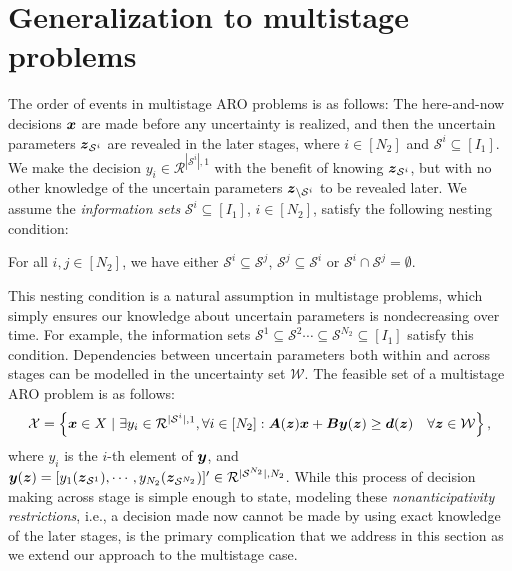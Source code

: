 \documentclass[fleqn,orsc,blindrev]{informs4}
\newcommand{\mb}[1]{\mbox{\boldmath \ensuremath{#1}}}
\begin{document}
\section{Generalization to multistage problems} \label{sec:multi}	
	The order of events in multistage ARO problems is as follows: The here-and-now decisions $\mb{x}$ are made before any uncertainty is realized, and then the uncertain parameters $\mb{z}_{\mathcal{S}^i}$ are revealed in the later stages, where $i\in [N_2]$ and $\mathcal{S}^i\subseteq [I_1]$. We make the decision $y_i \in \mathcal{R}^{|\mathcal{S}^i|,1}$ with the benefit of knowing $\mb{z}_{\mathcal{S}^i}$, but with no other knowledge of the uncertain parameters $\mb{z}_{\setminus \mathcal{S}^i}$ to be revealed later. We assume the {\em information sets} $\mathcal{S}^i\subseteq [I_1]$, $i\in [N_2]$, satisfy the following nesting condition: 
	\begin{definition}
		For all $i,j \in [N_2]$, we have either $\mathcal{S}^i \subseteq \mathcal{S}^j$, $\mathcal{S}^j \subseteq \mathcal{S}^i$ or $\mathcal{S}^i \cap \mathcal{S}^j = \emptyset$.
	\end{definition}
	This nesting condition is a natural assumption in multistage problems, which simply ensures our knowledge about uncertain parameters is nondecreasing over time. For example, the information sets $\mathcal{S}^1 \subseteq \mathcal{S}^2 \cdots \subseteq \mathcal{S}^{N_2}\subseteq [I_1]$ satisfy this condition.	Dependencies between uncertain parameters both within and across stages can be modelled in the uncertainty set $\mathcal{W}$. The feasible set of a multistage ARO problem is as follows:
\begin{equation} \label{set:Xm}
	\mathcal{X} = \left\{ \mb{x} \in X \hspace{3pt} | \hspace{3pt}  \exists y_i \in \mathcal{R}^{|\mathcal{S}^i|,1}, \forall i\in [N_2]: \mb{A}(\mb{z})\mb{x}+\mb{B}\mb{y}(\mb{z}) \geq\mb{d}(\mb{z})  \quad  \forall \mb{z} \in \mathcal{W} \right\},
\end{equation}
	where $y_i$ is the $i$-th element of $\mb{y}$, and $\mb{y}(\mb{z}) = [y_1(\mb{z}_{\mathcal{S}^1}), \cdots, y_{N_2} (\mb{z}_{\mathcal{S}^{N_2}})]' \in \mathcal{R}^{|\mathcal{S}^{N_2}|,N_2}$. While this process of decision making across stage is simple enough to state, modeling these \textit{nonanticipativity restrictions}, i.e., a decision made now cannot be made by using exact knowledge of the later stages, is the primary complication that we address in this section as we extend our approach to the multistage case. 
	
\end{document}
